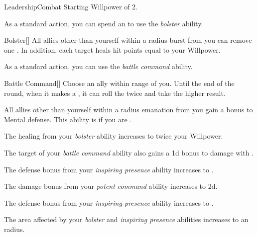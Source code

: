     \begin{feat}{Leadership}{Combat}
        \featpre Starting Willpower of 2.

         As a standard action, you can spend an  to use the \textit{bolster} ability.
        \begin{ability}{Bolster}[]
            All allies other than yourself within a \areamed radius burst from you can remove one .
            In addition, each target heals hit points equal to your Willpower.
        \end{ability}

         As a standard action, you can use the \textit{battle command} ability.
        \begin{ability}{Battle Command}[]
            Choose an ally within \rngmed range of you.
            Until the end of the round, when it makes a , it can roll the  twice and take the higher result.
        \end{ability}

         All allies other than yourself within a \arealarge radius emanation from you gain a  bonus to Mental defense.
        This ability is  if you are .

         The healing from your \textit{bolster} ability increases to twice your Willpower.

         The target of your \textit{battle command} ability also gains a \plus1d bonus to damage with .

         The defense bonus from your \textit{inspiring presence} ability increases to .

         The damage bonus from your \textit{potent command} ability increases to \plus2d.

         The defense bonus from your \textit{inspiring presence} ability increases to .

         The area affected by your \textit{bolster} and \textit{inspiring presence} abilities increases to an \areahuge radius.
    \end{feat}

